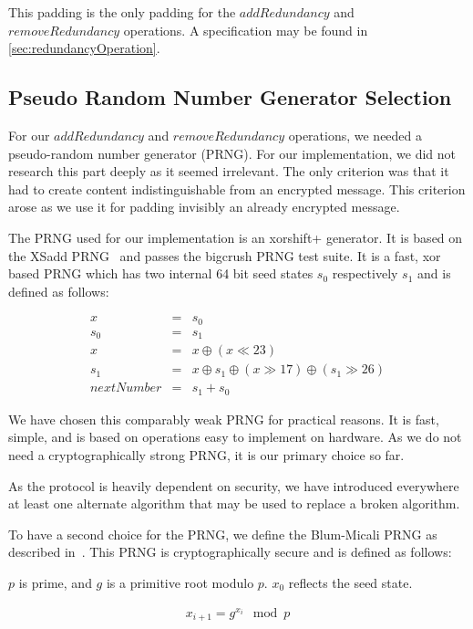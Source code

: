 This padding is the only padding for the $addRedundancy$ and $removeRedundancy$ operations. A specification may be found in \cref{sec:redundancyOperation}.

\subsection{Pseudo Random Number Generator Selection}\label{sec:prng}
For our $addRedundancy$ and $removeRedundancy$ operations, we needed a pseudo-random number generator (PRNG). For our implementation, we did not research this part deeply as it seemed irrelevant. The only criterion was that it had to create content indistinguishable from an encrypted message. This criterion arose as we use it for padding invisibly an already encrypted message.

The PRNG used for our implementation is an xorshift+ generator. It is based on the XSadd PRNG~\cite{marsaglia2003xorshift} and passes the bigcrush PRNG test suite. It is a fast, xor based PRNG which has two internal 64 bit seed states $s_0$ respectively $s_1$ and is defined as follows:

\begin{eqnarray}
	x & = & s_0\\
	s_0 & = & s_1\\
	x & = & x \oplus ( x \ll 23 )\\
	s_1 & = & x \oplus s_1 \oplus ( x \gg 17 ) \oplus (s_1 \gg 26 )\\
	nextNumber & = & s_1+s_0
\end{eqnarray}

We have chosen this comparably weak PRNG for practical reasons. It is fast, simple, and is based on operations easy to implement on hardware. As we do not need a cryptographically strong PRNG, it is our primary choice so far. 

As the protocol is heavily dependent on security, we have introduced everywhere at least one alternate algorithm that may be used to replace a broken algorithm. 

To have a second choice for the PRNG, we define the Blum-Micali PRNG as described in~\cite{blum1984generate}. This PRNG is cryptographically secure and is defined as follows:

$p$ is prime, and $g$ is a primitive root modulo $p$. $x_0$ reflects the seed state.

\begin{eqnarray}
	x_{i+1}=g^{x_i}\mod p
\end{eqnarray}

